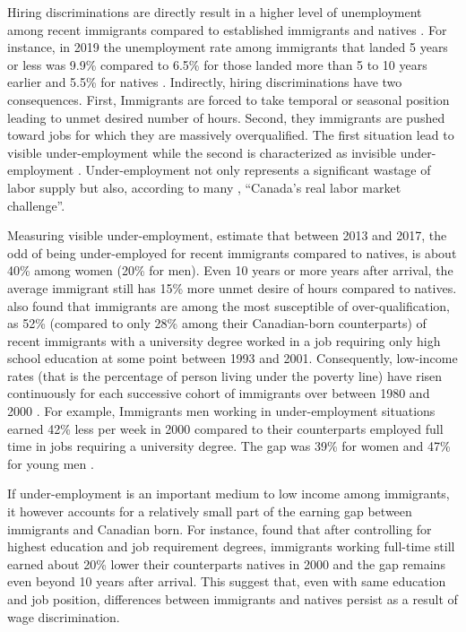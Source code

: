 \vspace{0.7em}\par
Hiring discriminations are directly result in a higher level of unemployment among recent immigrants compared to established immigrants and natives \citep{Oreopoulos:2011jv}.
For instance, in 2019 the unemployment rate among immigrants that landed 5 years or less was 9.9\% compared to 6.5\% for those landed more than 5 to 10 years earlier and 5.5\% for natives \citep{statCan:002}.
Indirectly, hiring discriminations have two consequences.
First, Immigrants are forced to take temporal or seasonal position leading to unmet desired number of hours.
Second, they immigrants are pushed toward jobs for which they are massively overqualified.
The first situation lead to visible under-employment while the second is characterized as invisible under-employment \citep{ilo:1982icls}.
Under-employment not only represents a significant wastage of labor supply \citep{Mitchell:2008wo} but also, according to many \citep{CanadianLabourCongress:2014wi,Li:2006uu}, ``Canada's real labor market challenge''.

\vspace{0.7em}\par
Measuring visible under-employment, \citet{gilbert:2020b} estimate that between 2013 and 2017, the odd of being under-employed for recent immigrants compared to natives, is about 40\% among women (20\% for men).
Even 10 years or more years after arrival, the average immigrant still has 15\% more unmet desire of hours compared to natives.
\citet{Li:2006uu} also found that immigrants are among the most susceptible of over-qualification, as 52\% (compared to only 28\% among their Canadian-born counterparts) of recent immigrants with a university degree worked in a job requiring only high school education at some point between 1993 and 2001.
Consequently, low-income rates (that is the percentage of person living under the poverty line) have risen continuously for each successive cohort of immigrants over between 1980 and 2000  \citep{picot2003rise}.
For example, Immigrants men working in under-employment situations earned 42\% less per week in 2000 compared to their counterparts employed full time in jobs requiring a university degree.
The gap was 39\% for women and 47\% for young men \citep{Morissette:wh}.

\vspace{0.7em}\par
If under-employment is an important medium to low income among immigrants, it however accounts for a relatively small part of the earning gap between immigrants and Canadian born.
For instance, \citet{Morissette:wh} found that after controlling for highest education and job requirement degrees, immigrants working full-time still earned about 20\% lower their counterparts natives in 2000 and the gap remains even beyond 10 years after arrival.
This suggest that, even with same education and job position, differences between immigrants and natives persist as a result of wage discrimination.


